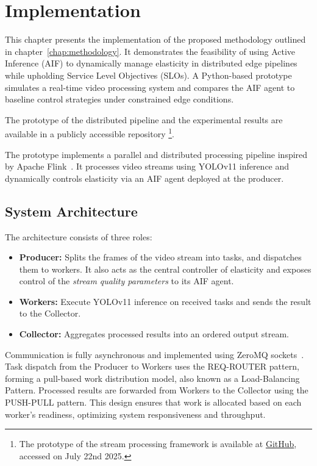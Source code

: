 \chapter{Implementation}
\label{chap:implementation}
This chapter presents the implementation of the proposed methodology outlined
in chapter~\ref{chap:methodology}. It demonstrates the feasibility of using Active Inference (AIF) to dynamically manage elasticity in distributed edge pipelines while upholding Service Level Objectives (SLOs). A Python-based prototype simulates a real-time video processing system and compares the AIF agent to baseline control strategies under constrained edge conditions.

The prototype of the distributed pipeline and the experimental results are available in a publicly accessible repository \footnote{The prototype of the stream processing framework is available at \href{https://github.com/JohnnyElaine/bsc_aif_parallel_pipeline}{GitHub}, accessed on July 22nd 2025.}.


The prototype implements a parallel and distributed processing pipeline inspired by Apache Flink~\cite{carbone_apache_2015}. It processes video streams using YOLOv11 inference and dynamically controls elasticity via an AIF agent deployed at the producer.

\section{System Architecture}
The architecture consists of three roles:
\begin{itemize}
    \item \textbf{Producer:} Splits the frames of the video stream into tasks, and dispatches them to workers. It also acts as the central controller of elasticity and exposes control of the \textit{stream quality parameters} to its AIF agent.
    \item \textbf{Workers:} Execute YOLOv11 inference on received tasks and sends the result to the Collector.
    \item \textbf{Collector:} Aggregates processed results into an ordered output stream.
\end{itemize}

Communication is fully asynchronous and implemented using ZeroMQ sockets~\cite{noauthor_zeromqpyzmq_nodate}. Task dispatch from the Producer to Workers uses the REQ-ROUTER pattern, forming a pull-based work distribution model, also known as a Load-Balancing Pattern. Processed results are forwarded from Workers to the Collector using the PUSH-PULL pattern. This design ensures that work is allocated based on each worker’s readiness, optimizing system responsiveness and throughput.

